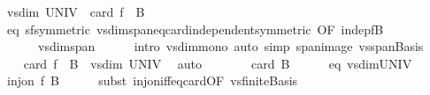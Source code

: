 \begin{isabellebody}
\ {\isachardoublequoteopen}vs{}{\isachardot}{\kern0pt}dim\ UNIV\ {\isasymle}\ card\ {\isacharparenleft}{\kern0pt}f\ {\isacharbackquote}{\kern0pt}\ B{}{\isacharparenright}{\kern0pt}{\isachardoublequoteclose}\isanewline
\ \ \ \ \isamarkupfalse%
\ eq\ sf{\isacharbrackleft}{\kern0pt}symmetric{\isacharbrackright}{\kern0pt}\ vs{}{\isachardot}{\kern0pt}dim{\isacharunderscore}{\kern0pt}span{\isacharunderscore}{\kern0pt}eq{\isacharunderscore}{\kern0pt}card{\isacharunderscore}{\kern0pt}independent{\isacharbrackleft}{\kern0pt}symmetric{\isacharcomma}{\kern0pt}\ OF\ indep{\isacharunderscore}{\kern0pt}fB{\isacharbrackright}{\kern0pt}\isanewline
\ \ \ \ \ \ vs{}{\isachardot}{\kern0pt}dim{\isacharunderscore}{\kern0pt}span\isanewline
\ \ \ \ \isamarkupfalse%
\ {\isacharparenleft}{\kern0pt}intro\ vs{}{\isachardot}{\kern0pt}dim{\isacharunderscore}{\kern0pt}mono{\isacharparenright}{\kern0pt}\ {\isacharparenleft}{\kern0pt}auto\ simp{\isacharcolon}{\kern0pt}\ span{\isacharunderscore}{\kern0pt}image\ vs{}{\isachardot}{\kern0pt}span{\isacharunderscore}{\kern0pt}Basis{\isacharparenright}{\kern0pt}\isanewline
\ \ \isamarkupfalse%
\ {\isacharasterisk}{\kern0pt}\ \isamarkupfalse%
\ {\isachardoublequoteopen}card\ {\isacharparenleft}{\kern0pt}f\ {\isacharbackquote}{\kern0pt}\ B{}{\isacharparenright}{\kern0pt}\ {\isacharequal}{\kern0pt}\ vs{}{\isachardot}{\kern0pt}dim\ UNIV{\isachardoublequoteclose}\ \isamarkupfalse%
\ auto\isanewline
\ \ \isamarkupfalse%
\ \isamarkupfalse%
\ {\isachardoublequoteopen}{\isachardot}{\kern0pt}{\isachardot}{\kern0pt}{\isachardot}{\kern0pt}\ {\isacharequal}{\kern0pt}\ card\ B{}{\isachardoublequoteclose}\isanewline
\ \ \ \ \isamarkupfalse%
\ eq\ vs{}{\isachardot}{\kern0pt}dim{\isacharunderscore}{\kern0pt}UNIV\ \isacommand{{\isachardot}{\kern0pt}{\isachardot}{\kern0pt}}\isamarkupfalse%
\isanewline
\ \ \isamarkupfalse%
\ \isamarkupfalse%
\ {\isachardoublequoteopen}inj{\isacharunderscore}{\kern0pt}on\ f\ B{}{\isachardoublequoteclose}\isanewline
\ \ \ \ \isamarkupfalse%
\ {\isacharparenleft}{\kern0pt}subst\ inj{\isacharunderscore}{\kern0pt}on{\isacharunderscore}{\kern0pt}iff{\isacharunderscore}{\kern0pt}eq{\isacharunderscore}{\kern0pt}card{\isacharbrackleft}{\kern0pt}OF\ vs{}{\isachardot}{\kern0pt}finite{\isacharunderscore}{\kern0pt}Basis{\isacharbrackright}{\kern0pt}{\isacharparenright}{\kern0pt}\isanewline

\end{isabellebody}
